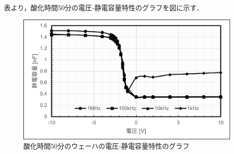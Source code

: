 \documentclass[11pt]{jarticle}
\begin{document}
			表より，酸化時間50分の電圧‐静電容量特性のグラフを図に示す．

			\begin{figure}[H]
			\centering
			\includegraphics[width = 12cm]{figs/wehacap50.png}
			\caption{酸化時間50分のウェーハの電圧‐静電容量特性のグラフ}
			\label{fig:wehacap50}
			\end{figure}
\end{document}
